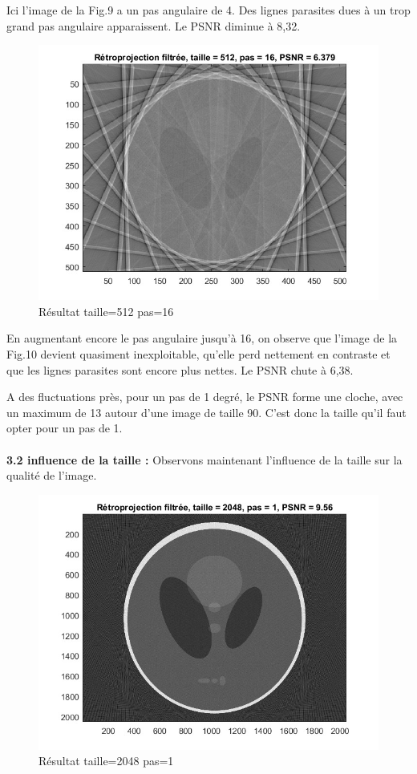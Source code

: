 \documentclass[conference]{IEEEtran}
\begin{document}
Ici l'image de la Fig.9 a un pas angulaire de 4. Des lignes parasites dues à un trop grand pas angulaire apparaissent. Le PSNR diminue à 8,32.

\begin{figure}[H]
\centering
\includegraphics[scale=0.5]{t512-p16}
	\caption[Résultat taille=512 pas=16]{Résultat taille=512 pas=16}
\label{fig:gallery}
\end{figure}

En augmentant encore le pas angulaire jusqu'à 16, on observe que l'image de la Fig.10 devient quasiment inexploitable, qu'elle perd nettement en contraste et que les lignes parasites sont encore plus nettes. Le PSNR chute à 6,38.

A des fluctuations près, pour un pas de 1 degré, le PSNR forme une cloche, avec un maximum de 13 autour d'une image de taille 90. C'est donc la taille qu'il faut opter pour un pas de 1.
\\
\\
\textbf{3.2 influence de la taille : }
Observons maintenant l'influence de la taille sur la qualité de l'image.

\begin{figure}[H]
\centering
\includegraphics[scale=0.5]{t2048-p1}
	\caption[Résultat taille=2048 pas=1]{Résultat taille=2048 pas=1}
\label{fig:gallery}
\end{figure}
\end{document}

